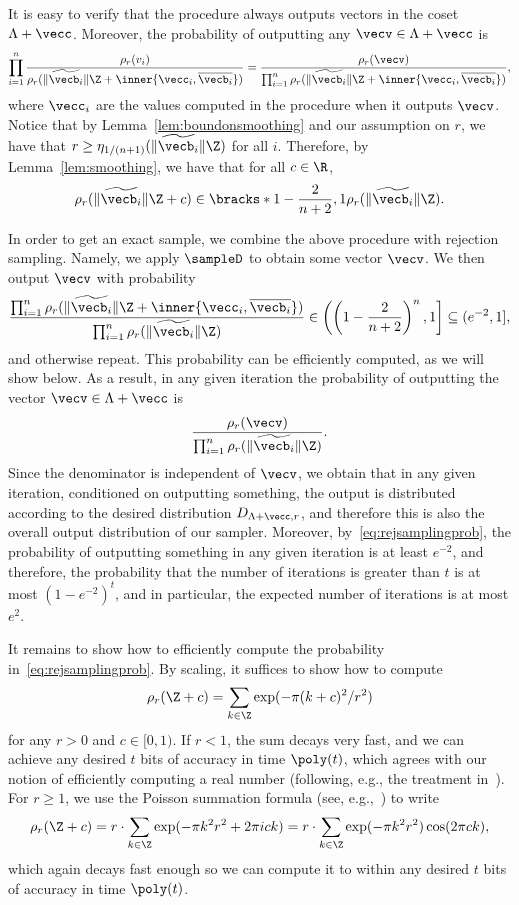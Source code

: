 It is easy to verify that the procedure always outputs vectors in the coset $\Lambda+\vecc$. Moreover, the probability of
outputting any $\vecv \in \Lambda+\vecc$ is 
\[
\prod_{i=1}^n \frac{\rho_r(v_i)}{\rho_r(\|\widetilde{\vecb_i}\| \Z + \inner{\vecc_i,\overline{\vecb_i}})} = 
\frac{\rho_r(\vecv)}{\prod_{i=1}^n \rho_r(\|\widetilde{\vecb_i}\| \Z + \inner{\vecc_i,\overline{\vecb_i}})},
\]
where $\vecc_i$ are the values computed in the procedure when it outputs $\vecv$.
Notice that by Lemma~\ref{lem:boundonsmoothing} and our assumption on $r$, 
we have that $r \ge \eta_{1/(n+1)}(\|\widetilde{\vecb_i}\| \Z)$ for all $i$.
Therefore, by Lemma~\ref{lem:smoothing}, we have that for all $c \in \R$,
\begin{equation*}%
\rho_r(\|\widetilde{\vecb_i}\| \Z + c) \in \bracks*{1-\frac{2}{n+2},1} \rho_r(\|\widetilde{\vecb_i}\| \Z).
\end{equation*}

In order to get an exact sample, we combine the above procedure with rejection sampling.
Namely, we apply $\sampleD$ to obtain some vector $\vecv$. We then output $\vecv$
with probability 
\begin{equation}\label{eq:rejsamplingprob}
\frac{\prod_{i=1}^n \rho_r(\|\widetilde{\vecb_i}\| \Z + \inner{\vecc_i,\overline{\vecb_i}})}
{\prod_{i=1}^n \rho_r(\|\widetilde{\vecb_i}\| \Z)} \in \left( \left(1-\frac{2}{n+2}\right)^n,1 \right] \subseteq (e^{-2},1],
\end{equation}
and otherwise repeat. This probability can be efficiently computed, as we will show below.
As a result, in any given iteration the probability of outputting the vector $\vecv \in \Lambda+\vecc$ is 
\[
\frac{\rho_r(\vecv)}{\prod_{i=1}^n \rho_r(\|\widetilde{\vecb_i}\| \Z )}.
\]
Since the denominator is independent of $\vecv$, we obtain that in any given iteration,
conditioned on outputting something, the output is distributed according to
the desired distribution $D_{\Lambda+\vecc,r}$, and therefore this is also the overall
output distribution of our sampler. Moreover, by~\eqref{eq:rejsamplingprob}, 
the probability of outputting something in any given iteration is at least
$e^{-2}$, and therefore, the probability that the number of iterations is
greater than $t$ is at most $(1-e^{-2})^t$, and in particular, the expected
number of iterations is at most $e^{2}$.

It remains to show how to efficiently compute the probability in~\eqref{eq:rejsamplingprob}. By scaling, it suffices to show 
how to compute 
\[
\rho_r(\Z+c) = \sum_{k \in \Z} \exp(-\pi (k+c)^2 / r^2)
\] 
for any $r>0$ and $c \in [0,1)$. If $r<1$, the sum decays very fast, and we can achieve any desired $t$ bits of 
accuracy in time $\poly(t)$, which agrees with our notion of efficiently computing a real number (following, 
e.g., the treatment in~\cite[Section 1.4]{LovaszBook}). For $r \ge 1$, we use the Poisson summation formula (see, e.g.,~\cite[Lemma 2.8]{DBLP:journals/siamcomp/MicciancioR07}) to write
\[
\rho_r(\Z+c) = r \cdot \sum_{k \in \Z} \exp(-\pi k^2 r^2 + 2 \pi i c k) = r \cdot \sum_{k \in \Z} \exp(-\pi k^2 r^2) \cos(2 \pi c k),
\] 
which again decays fast enough so we can compute it to within any desired $t$ bits of accuracy in time $\poly(t)$.


